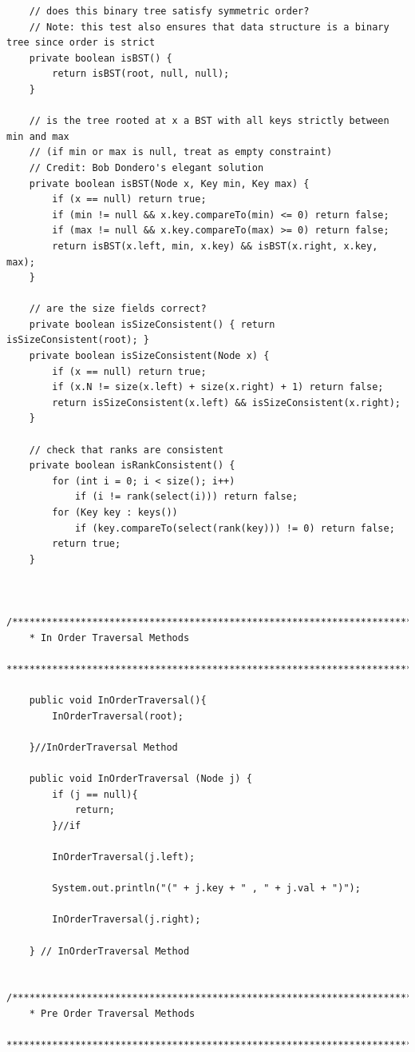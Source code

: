 \documentclass{article}
\begin{document}
\begin{lstlisting}
    // does this binary tree satisfy symmetric order?
    // Note: this test also ensures that data structure is a binary tree since order is strict
    private boolean isBST() {
        return isBST(root, null, null);
    }

    // is the tree rooted at x a BST with all keys strictly between min and max
    // (if min or max is null, treat as empty constraint)
    // Credit: Bob Dondero's elegant solution
    private boolean isBST(Node x, Key min, Key max) {
        if (x == null) return true;
        if (min != null && x.key.compareTo(min) <= 0) return false;
        if (max != null && x.key.compareTo(max) >= 0) return false;
        return isBST(x.left, min, x.key) && isBST(x.right, x.key, max);
    }

    // are the size fields correct?
    private boolean isSizeConsistent() { return isSizeConsistent(root); }
    private boolean isSizeConsistent(Node x) {
        if (x == null) return true;
        if (x.N != size(x.left) + size(x.right) + 1) return false;
        return isSizeConsistent(x.left) && isSizeConsistent(x.right);
    }

    // check that ranks are consistent
    private boolean isRankConsistent() {
        for (int i = 0; i < size(); i++)
            if (i != rank(select(i))) return false;
        for (Key key : keys())
            if (key.compareTo(select(rank(key))) != 0) return false;
        return true;
    }


    /****************************************************************************
    * In Order Traversal Methods
    *****************************************************************************/

    public void InOrderTraversal(){
    	InOrderTraversal(root);

    }//InOrderTraversal Method

    public void InOrderTraversal (Node j) {
    	if (j == null){
    		return;
    	}//if

    	InOrderTraversal(j.left);

    	System.out.println("(" + j.key + " , " + j.val + ")");

    	InOrderTraversal(j.right);

    } // InOrderTraversal Method

    /****************************************************************************
    * Pre Order Traversal Methods
    *****************************************************************************/


\end{lstlisting}
\end{document}
